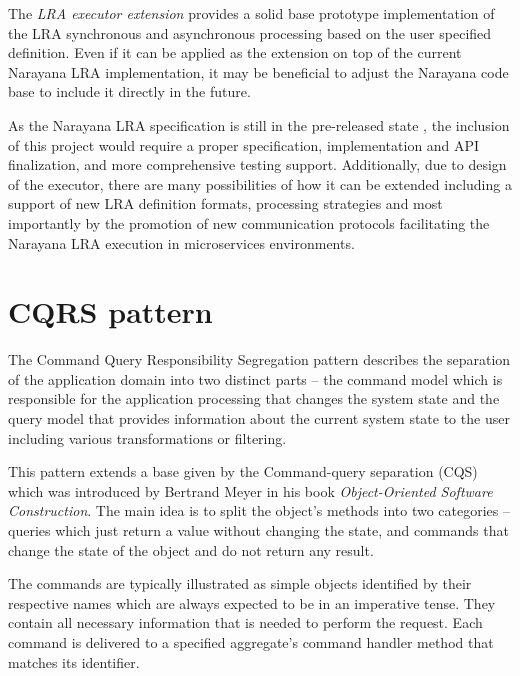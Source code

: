 \documentclass[oneside,
  digital, %
  table,   %
  lof,     %
  lot,     %
]{fithesis3}
\begin{document}
The \textit{LRA executor extension} provides a solid base prototype implementation of the LRA synchronous and asynchronous processing based on the user specified definition. Even if it can be applied as the extension on top of the current Narayana LRA implementation, it may be beneficial to adjust the Narayana code base to include it directly in the future. 

As the Narayana LRA specification is still in the pre-released state \cite{narayana_lra}, the inclusion of this project would require a proper specification, implementation and API finalization, and more comprehensive testing support. Additionally, due to design of the executor, there are many possibilities of how it can be extended including a support of new LRA definition formats, processing strategies and most importantly by the promotion of new communication protocols facilitating the Narayana LRA execution in microservices environments.

\makeatletter\thesis@blocks@clear\makeatother
{} %
\printindex




\appendix %

\clearpage
\chapter{CQRS pattern}
\label{sec:appendix-cqrs}

The Command Query Responsibility Segregation pattern describes the separation of the application domain into two distinct parts -- the command model which is responsible for the application processing that changes the system state and the query model that provides information about the current system state to the user including various transformations or filtering. 

This pattern extends a base given by the Command-query separation (CQS) which was introduced by Bertrand Meyer in his book \textit{Object-Oriented Software Construction}. The main idea is to split the object's methods into two categories -- queries which just return a value without changing the state, and commands that change the state of the object and do not return any result.

The commands are typically illustrated as simple objects identified by their respective names which are always expected to be in an imperative tense. They contain all necessary information that is needed to perform the request. Each command is delivered to a specified aggregate's command handler method that matches its identifier. 
\end{document}
